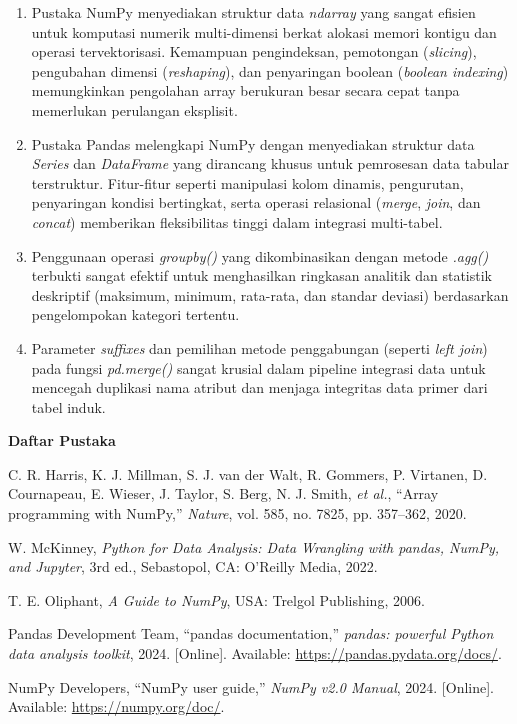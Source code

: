 \documentclass[12pt,a4paper]{article}
\begin{document}
\begin{enumerate}[itemsep=2pt]
    \item Pustaka NumPy menyediakan struktur data \textit{ndarray} yang sangat efisien untuk komputasi numerik multi-dimensi berkat alokasi memori kontigu dan operasi tervektorisasi. Kemampuan pengindeksan, pemotongan (\textit{slicing}), pengubahan dimensi (\textit{reshaping}), dan penyaringan boolean (\textit{boolean indexing}) memungkinkan pengolahan array berukuran besar secara cepat tanpa memerlukan perulangan eksplisit.
    \item Pustaka Pandas melengkapi NumPy dengan menyediakan struktur data \textit{Series} dan \textit{DataFrame} yang dirancang khusus untuk pemrosesan data tabular terstruktur. Fitur-fitur seperti manipulasi kolom dinamis, pengurutan, penyaringan kondisi bertingkat, serta operasi relasional (\textit{merge}, \textit{join}, dan \textit{concat}) memberikan fleksibilitas tinggi dalam integrasi multi-tabel.
    \item Penggunaan operasi \textit{groupby()} yang dikombinasikan dengan metode \textit{.agg()} terbukti sangat efektif untuk menghasilkan ringkasan analitik dan statistik deskriptif (maksimum, minimum, rata-rata, dan standar deviasi) berdasarkan pengelompokan kategori tertentu.
    \item Parameter \textit{suffixes} dan pemilihan metode penggabungan (seperti \textit{left join}) pada fungsi \textit{pd.merge()} sangat krusial dalam pipeline integrasi data untuk mencegah duplikasi nama atribut dan menjaga integritas data primer dari tabel induk.
\end{enumerate}

\vspace{0.3cm}
{}
\noindent{}\textbf{\normalsize Daftar Pustaka}\par
\vspace{0.15cm}

\begin{enumerate}[leftmargin=1.50cm, labelwidth=0.75cm, labelsep=0cm, align=left, itemsep=2pt, label={[\arabic*]}]
    \item C. R. Harris, K. J. Millman, S. J. van der Walt, R. Gommers, P. Virtanen, D. Cournapeau, E. Wieser, J. Taylor, S. Berg, N. J. Smith, \textit{et al.}, ``Array programming with NumPy,'' \textit{Nature}, vol. 585, no. 7825, pp. 357--362, 2020.
    \item W. McKinney, \textit{Python for Data Analysis: Data Wrangling with pandas, NumPy, and Jupyter}, 3rd ed., Sebastopol, CA: O'Reilly Media, 2022.
    \item T. E. Oliphant, \textit{A Guide to NumPy}, USA: Trelgol Publishing, 2006.
    \item Pandas Development Team, ``pandas documentation,'' \textit{pandas: powerful Python data analysis toolkit}, 2024. [Online]. Available: \url{https://pandas.pydata.org/docs/}.
    \item NumPy Developers, ``NumPy user guide,'' \textit{NumPy v2.0 Manual}, 2024. [Online]. Available: \url{https://numpy.org/doc/}.
\end{enumerate}
\end{document}
